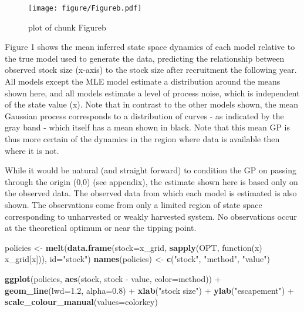 \documentclass[author-year, review]{elsarticle} %
\makeatletter
\newenvironment{Shaded}{}{}
\newcommand{\KeywordTok}[1]{\textcolor[rgb]{0.00,0.44,0.13}{\textbf{{#1}}}}
\newcommand{\DataTypeTok}[1]{\textcolor[rgb]{0.56,0.13,0.00}{{#1}}}
\newcommand{\FloatTok}[1]{\textcolor[rgb]{0.25,0.63,0.44}{{#1}}}
\newcommand{\StringTok}[1]{\textcolor[rgb]{0.25,0.44,0.63}{{#1}}}
\newcommand{\NormalTok}[1]{{#1}}
\def\maxwidth{\ifdim\Gin@nat@width>\linewidth\linewidth
\else\Gin@nat@width\fi}
\let\Oldincludegraphics\includegraphics
\renewcommand{\includegraphics}[1]{\Oldincludegraphics[width=\maxwidth]{#1}}
\makeatother
\begin{document}
\begin{figure}[htbp]
\centering
\texttt{[image: figure/Figureb.pdf]}
\caption{plot of chunk Figureb}
\end{figure}

Figure 1 shows the mean inferred state space dynamics of each model
relative to the true model used to generate the data, predicting the
relationship between observed stock size (x-axis) to the stock size
after recruitment the following year. All models except the MLE model
estimate a distribution around the means shown here, and all models
estimate a level of process noise, which is independent of the state
value (x). Note that in contrast to the other models shown, the mean
Gaussian process corresponds to a distribution of curves - as indicated
by the gray band - which itself has a mean shown in black. Note that
this mean GP is thus more certain of the dynamics in the region where
data is available then where it is not.

While it would be natural (and straight forward) to condition the GP on
passing through the origin (0,0) (see appendix), the estimate shown here
is based only on the observed data. The observed data from which each
model is estimated is also shown. The observations come from only a
limited region of state space corresponding to unharvested or weakly
harvested system. No observations occur at the theoretical optimum or
near the tipping point.

\begin{Shaded}
\begin{Highlighting}[]
\NormalTok{policies <- }\KeywordTok{melt}\NormalTok{(}\KeywordTok{data.frame}\NormalTok{(}\DataTypeTok{stock=}\NormalTok{x_grid, }\KeywordTok{sapply}\NormalTok{(OPT, function(x) x_grid[x])), }\DataTypeTok{id=}\StringTok{"stock"}\NormalTok{)}
\KeywordTok{names}\NormalTok{(policies) <- }\KeywordTok{c}\NormalTok{(}\StringTok{"stock"}\NormalTok{, }\StringTok{"method"}\NormalTok{, }\StringTok{"value"}\NormalTok{)}

\KeywordTok{ggplot}\NormalTok{(policies, }\KeywordTok{aes}\NormalTok{(stock, stock - value, }\DataTypeTok{color=}\NormalTok{method)) +}
  \KeywordTok{geom_line}\NormalTok{(}\DataTypeTok{lwd=}\FloatTok{1.2}\NormalTok{, }\DataTypeTok{alpha=}\FloatTok{0.8}\NormalTok{) + }\KeywordTok{xlab}\NormalTok{(}\StringTok{"stock size"}\NormalTok{) + }\KeywordTok{ylab}\NormalTok{(}\StringTok{"escapement"}\NormalTok{)  +}
  \KeywordTok{scale_colour_manual}\NormalTok{(}\DataTypeTok{values=}\NormalTok{colorkey)}
\end{Highlighting}
\end{Shaded}
\end{document}
